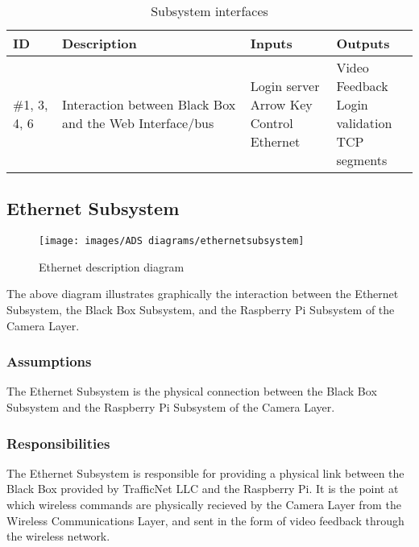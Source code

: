 \begin {table}[H]
\caption {Subsystem interfaces} 
\begin{center}
    \begin{tabular}{ | p{1cm} | p{6cm} | p{3cm} | p{3cm} |}
    \hline
    ID & Description & Inputs & Outputs \\ \hline
    \#1, 3, 4, 6 & Interaction between Black Box and the Web Interface/bus & \pbox{3cm}{Login server \\ Arrow Key Control \\ Ethernet} & \pbox{3cm}{Video Feedback \\ Login validation \\ TCP segments}  \\ \hline
    \end{tabular}
\end{center}
\end{table}

\subsection{Ethernet Subsystem}

\begin{figure}[h!]
	\centering
 	\texttt{[image: images/ADS diagrams/ethernetsubsystem]}
 \caption{Ethernet description diagram}
\end{figure}

The above diagram illustrates graphically the interaction between the Ethernet Subsystem, the Black Box Subsystem, and the Raspberry Pi Subsystem of the Camera Layer. 

\subsubsection{Assumptions}
The Ethernet Subsystem is the physical connection between the Black Box Subsystem and the Raspberry Pi Subsystem of the Camera Layer.

\subsubsection{Responsibilities}
The Ethernet Subsystem is responsible for providing a physical link between the Black Box provided by TrafficNet LLC and the Raspberry Pi. It is the point at which wireless commands are physically recieved by the Camera Layer from the Wireless Communications Layer, and sent in the form of video feedback through the wireless network.

